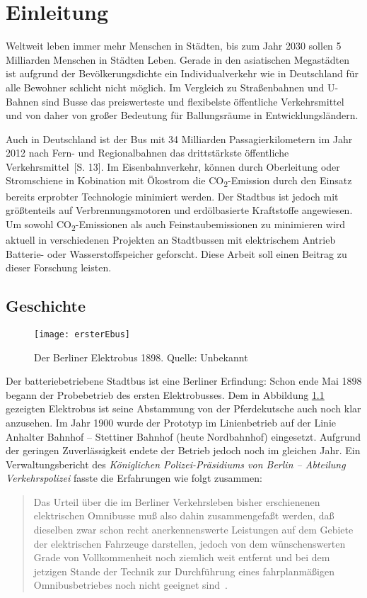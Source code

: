 \chapter{Einleitung}
Weltweit leben immer mehr Menschen in Städten, bis zum Jahr 2030 sollen 5 Milliarden Menschen in Städten Leben. Gerade in den asiatischen Megastädten ist aufgrund der Bevölkerungsdichte ein Individualverkehr wie in Deutschland für alle Bewohner schlicht nicht möglich. Im Vergleich zu Straßenbahnen und U-Bahnen sind Busse das preiswerteste und flexibelste öffentliche Verkehrsmittel und von daher von großer Bedeutung für Ballungsräume in Entwicklungsländern.

Auch in Deutschland ist der Bus mit 34 Milliarden Passagierkilometern im Jahr 2012 nach Fern- und Regionalbahnen das drittstärkste öffentliche Verkehrsmittel~\cite{Verband-Deutscher-Verkehrsunternehmen:2013}[S. 13]. Im Eisenbahnverkehr, können durch Oberleitung oder Stromschiene in Kobination mit Ökostrom die CO\textsubscript{2}-Emission durch den Einsatz bereits erprobter Technologie minimiert werden. Der Stadtbus ist jedoch mit größtenteils auf Verbrennungsmotoren und erdölbasierte Kraftstoffe angewiesen. Um sowohl CO\textsubscript{2}-Emissionen als auch Feinstaubemissionen zu minimieren wird aktuell in verschiedenen Projekten an Stadtbussen mit elektrischem Antrieb Batterie- oder Wasserstoffspeicher geforscht. Diese Arbeit soll einen Beitrag zu dieser Forschung leisten.

\section{Geschichte}
\label{abs_geschichte}
\begin{figure}\centering
	\texttt{[image: ersterEbus]}
	\caption[Der Berliner Elektrobus 1898]{Der Berliner Elektrobus 1898. Quelle: Unbekannt}
	\label{abb_ersterEbus}
\end{figure}

Der batteriebetriebene Stadtbus ist eine Berliner Erfindung: Schon ende Mai 1898 begann der Probebetrieb des ersten Elektrobusses. Dem in Abbildung \ref{abb_ersterEbus} gezeigten Elektrobus ist seine Abstammung von der Pferdekutsche auch noch klar anzusehen.  Im Jahr 1900 wurde der Prototyp im Linienbetrieb auf der Linie Anhalter Bahnhof – Stettiner Bahnhof (heute Nordbahnhof) eingesetzt. Aufgrund der geringen Zuverlässigkeit endete der Betrieb jedoch noch im gleichen Jahr. Ein Verwaltungsbericht des \emph{Königlichen Polizei-Präsidiums von Berlin – Abteilung Verkehrspolizei} fasste die Erfahrungen wie folgt zusammen:
\begin{quote}
	Das Urteil über die im Berliner Verkehrsleben bisher erschienenen elektrischen Omnibusse muß also dahin zusammengefaßt werden, daß dieselben zwar schon recht anerkennenswerte Leistungen auf dem Gebiete der elektrischen Fahrzeuge darstellen, jedoch von dem wünschenswerten Grade von Vollkommenheit noch ziemlich weit entfernt und bei dem jetzigen Stande der Technik zur Durchführung eines fahrplanmäßigen Omnibusbetriebes noch nicht geeignet sind~\cite{ersterEbus}.
\end{quote}

